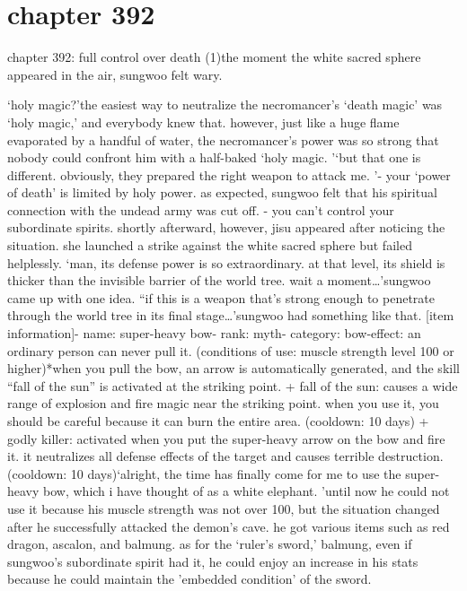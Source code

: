 \section{chapter 392}

chapter 392: full control over death (1)the moment the white sacred sphere appeared in the air, sungwoo felt wary.





‘holy magic?’the easiest way to neutralize the necromancer’s ‘death magic’ was ‘holy magic,’ and everybody knew that.
 however, just like a huge flame evaporated by a handful of water, the necromancer’s power was so strong that nobody could confront him with a half-baked ‘holy magic.
’‘but that one is different.
 obviously, they prepared the right weapon to attack me.
’- your ‘power of death’ is limited by holy power.
as expected, sungwoo felt that his spiritual connection with the undead army was cut off.
- you can’t control your subordinate spirits.
shortly afterward, however, jisu appeared after noticing the situation.
 she launched a strike against the white sacred sphere but failed helplessly.
‘man, its defense power is so extraordinary.
 at that level, its shield is thicker than the invisible barrier of the world tree.
 wait a moment…’sungwoo came up with one idea.
“if this is a weapon that’s strong enough to penetrate through the world tree in its final stage…’sungwoo had something like that.
[item information]- name: super-heavy bow- rank: myth- category: bow-effect: an ordinary person can never pull it.
 (conditions of use: muscle strength level 100 or higher)*when you pull the bow, an arrow is automatically generated, and the skill “fall of the sun” is activated at the striking point.
+ fall of the sun: causes a wide range of explosion and fire magic near the striking point.
when you use it, you should be careful because it can burn the entire area.
 (cooldown: 10 days)
+ godly killer: activated when you put the super-heavy arrow on the bow and fire it.
 it neutralizes all defense effects of the target and causes terrible destruction.
 (cooldown: 10 days)‘alright, the time has finally come for me to use the super-heavy bow, which i have thought of as a white elephant.
’until now he could not use it because his muscle strength was not over 100, but the situation changed after he successfully attacked the demon’s cave.
he got various items such as red dragon, ascalon, and balmung.
 as for the ‘ruler’s sword,’ balmung, even if sungwoo’s subordinate spirit had it, he could enjoy an increase in his stats because he could maintain the ’embedded condition’ of the sword.
